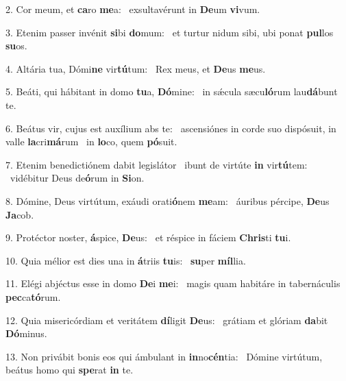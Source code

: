 2. Cor meum, et \textbf{ca}ro \textbf{me}a: \ast\  exsultavérunt in \textbf{De}um \textbf{vi}vum.\

3. Etenim passer invénit \textbf{si}bi \textbf{do}mum: \ast\  et turtur nidum sibi, ubi ponat \textbf{pul}los \textbf{su}os.\

4. Altária tua, Dómi\textbf{ne} vir\textbf{tú}tum: \ast\  Rex meus, et \textbf{De}us \textbf{me}us.\

5. Beáti, qui hábitant in domo \textbf{tu}a, \textbf{Dó}mine: \ast\  in sǽcula sæcu\textbf{ló}rum lau\textbf{dá}bunt te.\

6. Beátus vir, cujus est auxílium abs te: \dag\  ascensiónes in corde suo dispósuit, in valle \textbf{la}cri\textbf{má}rum \ast\  in \textbf{lo}co, quem \textbf{pó}suit.\

7. Etenim benedictiónem dabit legislátor \dag\  ibunt de virtúte \textbf{in} vir\textbf{tú}tem: \ast\  vidébitur Deus de\textbf{ó}rum in \textbf{Si}on.\

8. Dómine, Deus virtútum, exáudi orati\textbf{ó}nem \textbf{me}am: \ast\  áuribus pércipe, \textbf{De}us \textbf{Ja}cob.\

9. Protéctor noster, \textbf{á}spice, \textbf{De}us: \ast\  et réspice in fáciem \textbf{Chris}ti \textbf{tu}i.\

10. Quia mélior est dies una in \textbf{á}triis \textbf{tu}is: \ast\  \textbf{su}per \textbf{míl}lia.\

11. Elégi abjéctus esse in domo \textbf{De}i \textbf{me}i: \ast\  magis quam habitáre in tabernáculis \textbf{pec}ca\textbf{tó}rum.\

12. Quia misericórdiam et veritátem \textbf{dí}ligit \textbf{De}us: \ast\  grátiam et glóriam \textbf{da}bit \textbf{Dó}minus.\

13. Non privábit bonis eos qui ámbulant in \textbf{in}no\textbf{cén}tia: \ast\  Dómine virtútum, beátus homo qui \textbf{spe}rat \textbf{in} te.\

